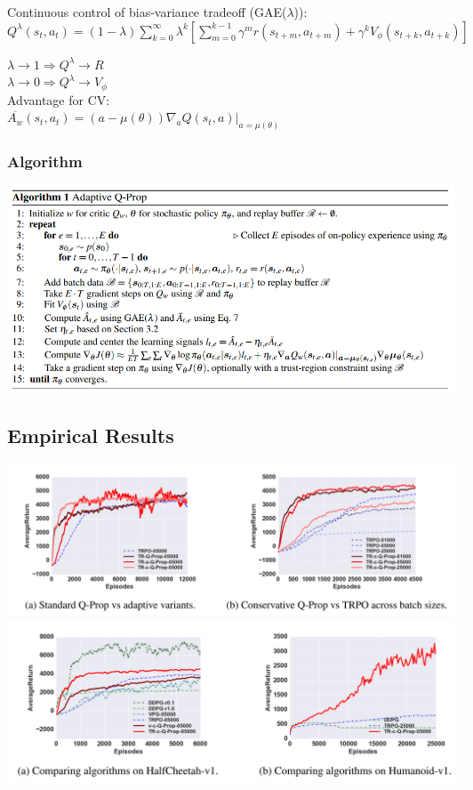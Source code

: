 \documentclass{beamer}
\begin{document}
\begin{frame}[t]

Continuous control of bias-variance tradeoff (GAE($\lambda$)):\\
\vspace{1mm}
$Q^\lambda (s_t,a_t) = (1-\lambda) \sum_{k=0}^{\infty} \lambda^k \left[ \sum_{m=0}^{k-1} \gamma^m r(s_{t+m}, a_{t+m}) + \gamma^{k} V_\phi  (s_{t+k}, a_{t+k}) \right]$

\vspace{1.5mm}
$\lambda \rightarrow 1 \Rightarrow Q^\lambda \rightarrow R$\\
$\lambda \rightarrow 0 \Rightarrow Q^\lambda \rightarrow V_\phi$\\

\vspace{4mm}
Advantage for CV:\\
$\overline{A_w} (s_t,a_t) = (a - \mu(\theta) )\nabla_a Q(s_t,a)|_{a=\mu(\theta)}$
\end{frame}

\begin{frame}[t]
\frametitle{Algorithm}
\includegraphics[scale=0.35]{q-prop-algo}
\end{frame}

\subsection{Empirical Results}
\begin{frame}[t]
\includegraphics[scale=0.23]{q-prop1}
\includegraphics[scale=0.23]{q-prop2}
\end{frame}
\end{document}
